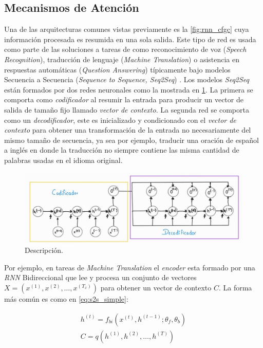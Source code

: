 \subsection{Mecanismos de Atención}

Una de las arquitecturas comunes vistas previamente es la \ref{fig:rnn_cfgc} cuya información
procesada es resumida en una sola salida. Este tipo de red es usada como parte de las soluciones a
tareas de como reconocimiento de voz (\textit{Speech Recognition}), traducción de lenguaje
(\textit{Machine Translation}) o asistencia en respuestas automáticas (\textit{Question Answering})
típicamente bajo modelos Secuencia a Secuencia (\textit{Sequence to Sequence, Seq2Seq})
\cite{DBLP:journals/corr/ChoMGBSB14}. Los modelos
\textit{Seq2Seq} están formados por dos redes neuronales como la mostrada en \ref{fig:seq2seq}. La
primera se comporta como \textit{codificador} al resumir la entrada para producir un vector de salida
de tamaño fijo llamado \textit{vector de contexto}. La segunda red se comporta como un
\textit{decodificador}, este es inicializado y condicionado con el
\textit{vector de contexto} para obtener una transformación de la entrada no necesariamente del
mismo tamaño de secuencia, ya sea por ejemplo, traducir una oración de español a inglés en donde la
traducción no siempre contiene las misma cantidad de palabras usadas en el idioma original.

\begin{figure}[ht!]
    \centering
    \includegraphics[width=1.0 \textwidth]{Chapters/1. Transformer/Figures/rnn/seq2seq.jpg}
    \caption{Descripción.}
    \label{fig:seq2seq}
\end{figure}

Por ejemplo, en tareas de \textit{Machine Translation} el \textit{encoder} esta formado por una
\textit{RNN} Bidireccional que lee y procesa un conjunto de
vectores $X = (x^{(1)}, x^{(2)}, \dots, x^{(T_x)})$ para obtener un vector de contexto $C$. La forma
más común es como en \ref{eq:s2s_simple}:

\begin{equation}
    \begin{split}
        h^{(t)} = f_{bi}(x^{(t)}, h^{(t-1)}; \theta_{f}, \theta_{b}) \\
        C = q({h^{(1)}, h^{(2)}, \dots, h^{(T)}})
    \end{split}
    \label{eq:s2s_simple}
\end{equation}

